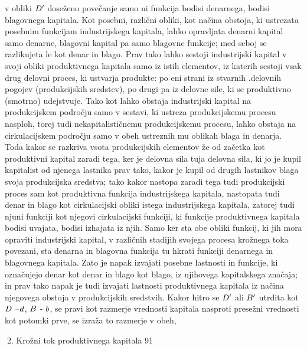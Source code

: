 \documentclass[kapital_02.tex]{subfiles}
\begin{document}
 v obliki \( D' \) doseženo povečanje samo ni funkcija bodisi denarnega, bodisi blagovnega kapitala. Kot posebni, različni obliki, kot načina obstoja, ki ustrezata posebnim funkcijam industrijskega kapitala, lahko opravljata denarni kapital samo denarne, blagovni kapital pa samo blagovne funkcije; med seboj se razlikujeta le kot denar in blago. Prav tako lahko sestoji industrijski kapital v svoji obliki produktivnega kapitala samo iz istih elementov, iz katerih sestoji vsak drug delovni proces, ki ustvarja produkte: po eni strani iz stvarnih .delovnih pogojev (produkcijskih sredstev), po drugi pa iz delovne sile, ki se produktivno (smotrno) udejstvuje. Tako kot lahko obstaja industrijski kapital na produkcijskem področju samo v sestavi, ki ustreza produkcijskemu procesu nasploh, torej tudi nekapitalističnemu produkcijskemu procesu, lahko obstaja na cirkulacijskem področju samo v obeh ustreznih mu oblikah blaga in denarja. Toda kakor se razkriva vsota produkcijskih elementov že od začetka kot produktivni kapital zaradi tega, ker je delovna sila tuja delovna sila, ki jo je kupil kapitalist od njenega lastnika prav tako, kakor je kupil od drugih lastnikov blaga svoja produkcijska sredstva; tako kakor nastopa zaradi tega tudi produkcijski proces sam kot produktivna funkcija industrijskega kapitala, nastopata tudi denar in blago kot cirkulacijski obliki istega industrijskega kapitala, zatorej tudi njuni funkciji kot njegovi cirkulacijski funkciji, ki funkcije produktivnega kapitala bodisi uvajata, bodisi izhajata iz njih. Samo ker sta obe obliki funkcij, ki jih mora opraviti industrijski kapital, v različnih stadijih svojega procesa krožnega toka povezani, sta denarna in blagovna funkcija tu hkrati funkciji denarnega in blagovnega kapitala. Zato je napak izvajati posebne lastnosti in funkcije, ki označujejo denar kot denar in blago kot blago, iz njihovega kapitalskega značaja; in prav tako napak je tudi izvajati lastnosti produktivnega kapitala iz načina njegovega obstoja v produkcijskih sredstvih. Kakor hitro se \( D' \) ali \( B' \) utrdita kot \( D \) --\( d \), \( B \) - \( b \), se pravi kot razmerje vrednosti kapitala nasproti presežni vrednosti kot potomki prve, se izraža to razmerje v obeh,



2. Krožni tok produktivnega kapitala 91
\end{document}

